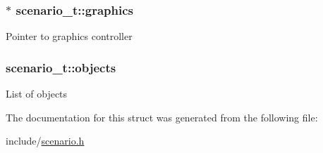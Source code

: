 \subsubsection[{\texorpdfstring{graphics}{graphics}}]{$\ast$ scenario\+\_\+t\+::graphics}\hypertarget{structscenario__t_a00790b5954aa1761fec84cbd3319ed16}{}\label{structscenario__t_a00790b5954aa1761fec84cbd3319ed16}
Pointer to graphics controller 
\subsubsection[{\texorpdfstring{objects}{objects}}]{ scenario\+\_\+t\+::objects}\hypertarget{structscenario__t_ab01a8a6fa25d26374ff9b261e7512c1c}{}\label{structscenario__t_ab01a8a6fa25d26374ff9b261e7512c1c}
List of objects 

The documentation for this struct was generated from the following file\+:\begin{DoxyCompactItemize}
\item 
include/\hyperlink{scenario_8h}{scenario.\+h}\end{DoxyCompactItemize}
